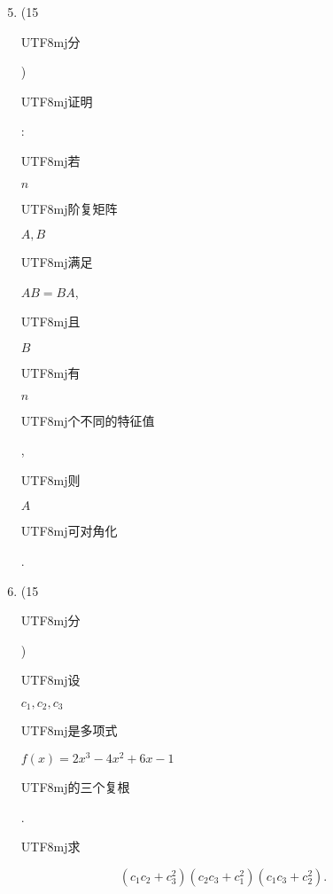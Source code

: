 \documentclass[10pt]{article}
\begin{document}
\begin{enumerate}
  \setcounter{enumi}{4}
  \item (15 \begin{CJK}{UTF8}{mj}分\end{CJK}) \begin{CJK}{UTF8}{mj}证明\end{CJK}: \begin{CJK}{UTF8}{mj}若\end{CJK} $n$ \begin{CJK}{UTF8}{mj}阶复矩阵\end{CJK} $A, B$ \begin{CJK}{UTF8}{mj}满足\end{CJK} $A B=B A$, \begin{CJK}{UTF8}{mj}且\end{CJK} $B$ \begin{CJK}{UTF8}{mj}有\end{CJK} $n$ \begin{CJK}{UTF8}{mj}个不同的特征值\end{CJK}, \begin{CJK}{UTF8}{mj}则\end{CJK} $A$ \begin{CJK}{UTF8}{mj}可对角化\end{CJK}.

  \item (15 \begin{CJK}{UTF8}{mj}分\end{CJK}) \begin{CJK}{UTF8}{mj}设\end{CJK} $c_{1}, c_{2}, c_{3}$ \begin{CJK}{UTF8}{mj}是多项式\end{CJK} $f(x)=2 x^{3}-4 x^{2}+6 x-1$ \begin{CJK}{UTF8}{mj}的三个复根\end{CJK}. \begin{CJK}{UTF8}{mj}求\end{CJK}

\end{enumerate}
$$
\left(c_{1} c_{2}+c_{3}^{2}\right)\left(c_{2} c_{3}+c_{1}^{2}\right)\left(c_{1} c_{3}+c_{2}^{2}\right) .
$$
\end{document}
